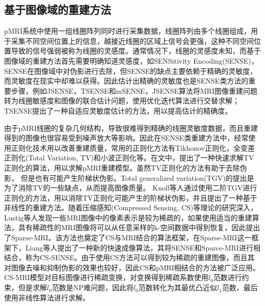 \documentclass[lang=cn,11pt,a4paper,cite=numbers]{elegantpaper}
\begin{document}
\subsection{基于图像域的重建方法}
\par pMRI系统中使用一组线圈阵列同时进行采集数据，线圈阵列由多个线圈组成，用于采集不同空间位置上的信息，越接近线圈的区域上信号会更强，这种不同空间位置导致的信号强弱被称为线圈的灵感度。通常情况下，线圈的灵感度未知，而基于图像域的重建方法首先需要明确知道灵感度，如SENSitivity Encoding(SENSE)\cite{pruessmann1999sense}，SENSE在图像域中对伪影进行去除，但SENSE的缺点主要依赖于精确的灵敏度，而灵敏度在现实中却难以获得。因此估计出精确的灵敏度也是SENSE类方法的重要步骤，例如JSENSE\cite{ying2007joint}，TSENSE\cite{kellman2001adaptive}和mSENSE\cite{kreitner2006fast}，JSENSE算法将MRI图像重建问题转为线圈敏感度和图像的联合估计问题，使用优化迭代算法进行交替求解；TSENSE提出了一种自适应灵敏度估计的方法，用以提高估计的精确度。
\par 由于pMRI线圈的复杂几何结构，导致很难得到精确的线圈灵敏度数据，而且重建得到的图像也很容易受到噪声放大等影响。因此在SENSE类重建方法中，经常使用正则化技术用以改善重建质量，常用的正则化方法有Tikhonov正则化，全变差正则化(Total Variation, TV)和小波正则化等。在文\cite{ye2010computational}中，提出了一种快速求解TV正则化的算法，用以求解pMRI重建模型。虽然TV正则化的方法有助于去除伪影， 但是也有可能产生阶梯状伪影。Total generalized variation(TGV)\cite{bredies2010total}的提出是为了消除TV的一些缺点，从而提高图像质量。 Knoll等人\cite{knoll2012parallel}通过使用二阶TGV进行正则化的方法，用以消除TV正则化可能产生的阶梯状伪影，并且提出了一种基于非线性的重建方法。随着压缩感知(Compressed Sensing, CS)等理论的研究深入，Lustig等人发现一些MRI图像中的像素表示是较为稀疏的，如果使用适当的重建算法，具有稀疏性的MRI图像将可以从任意采样的k-空间数据中得到恢复，因此提出了Sparse-MRI\cite{lustig2007sparse}。该方法也奠定了CS与MRI结合的算法框架，在Sparse-MRI这一框架下，Liang等人提出了一种新的快速成像算法，其将SENSE和Sparce-MRI进行相结合，称为CS-SENSE\cite{liang2009accelerating}。由于使用CS方法可以得到较为稀疏的重建图像，而且其对图像去噪和抑制伪影的效果也较好，因此CS和pMRI相结合的方法被广泛应用。CS-MRI模型对目标图像进行稀疏变换，对变换得到稀疏系数使用$l_0$范数进行约束，但是求解$l_0$范数是NP难问题，因此将$l_0$范数转化为其最优凸近似$l_1$范数，最后使用非线性算法进行求解。
\end{document}
